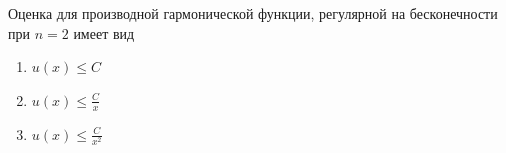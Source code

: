 Оценка для производной гармонической функции, регулярной на бесконечности при \(n = 2\) имеет вид

\begin{enumerate}[label=\arabic*)]
    \item \(u(x)\leq C\)
    \item \(u(x)\leq \frac{C}{x}\)
    \item \(u(x)\leq \frac{C}{x^2}\)
\end{enumerate}

